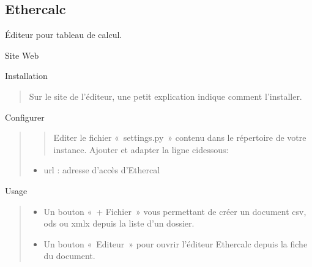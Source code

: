 \documentclass[letterpaper,10pt,french]{sphinxmanual}
\begin{document}
\noindent{}


\subsection{Ethercalc}
\label{\detokenize{documents/editor:ethercalc}}
\sphinxAtStartPar
Éditeur pour tableau de calcul.

\sphinxAtStartPar
Site Web
\begin{quote}

\sphinxAtStartPar
{}
\end{quote}

\sphinxAtStartPar
Installation
\begin{quote}

\sphinxAtStartPar
Sur le site de l’éditeur, une petit explication indique comment l’installer.
\end{quote}

\sphinxAtStartPar
Configurer
\begin{quote}
\begin{quote}

\sphinxAtStartPar
Editer le fichier « settings.py » contenu dans le répertoire de votre instance.
Ajouter et adapter la ligne ci\sphinxhyphen{}dessous:
\end{quote}
\begin{itemize}
\item {} 
\sphinxAtStartPar
url : adresse d’accès d’Ethercal

\end{itemize}
\end{quote}

\begin{sphinxVerbatim}[commandchars=\\\{\}]
   
\end{sphinxVerbatim}

\sphinxAtStartPar
Usage
\begin{quote}
\begin{description}
\begin{itemize}
\item {} 
\sphinxAtStartPar
Un bouton « + Fichier » vous permettant de créer un document csv, ods ou xmlx depuis la liste d’un dossier.

\item {} 
\sphinxAtStartPar
Un bouton « Editeur » pour ouvrir l’éditeur Ethercalc depuis la fiche du document.

\end{itemize}

\end{description}
\end{quote}
\end{document}
